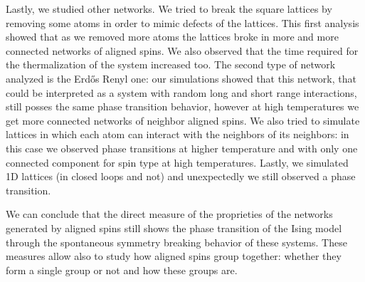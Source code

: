Lastly, we studied other networks. We tried to break the square lattices by removing some atoms in order to mimic defects of the lattices. This first analysis showed that as we removed more atoms the lattices broke in more and more connected networks of aligned spins. We also observed that the time required for the thermalization of the system increased too. The second type of network analyzed is the Erdős Renyl one: our simulations showed that this network, that could be interpreted as a system with random long and short range interactions, still posses the same phase transition behavior, however at high temperatures we get more connected networks of neighbor aligned spins. We also tried to simulate lattices in which each atom can interact with the neighbors of its neighbors: in this case we observed phase transitions at higher temperature and with only one connected component for spin type at high temperatures.  Lastly, we simulated 1D lattices (in closed loops and not) and unexpectedly we still observed a phase transition.

We can conclude that the direct measure of the proprieties of the networks generated by aligned spins still shows the phase transition of the Ising model through the spontaneous symmetry breaking behavior of these systems. These measures allow also to study how aligned spins group together: whether they form a single group or not and how these groups are.

